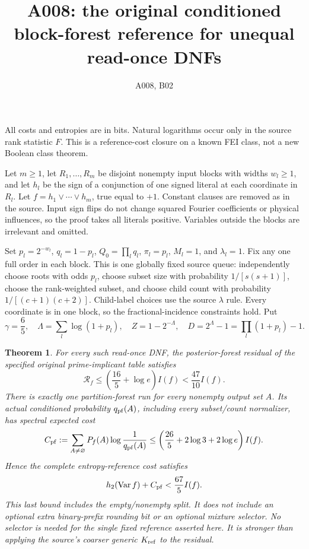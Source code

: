 \documentclass{article}
\newtheorem{theorem}{Theorem}
\begin{document}
\title{A008: the original conditioned block-forest reference for unequal read-once DNFs}
\author{A008, B02}\maketitle
All costs and entropies are in bits. Natural logarithms occur only in the source rank statistic $F$. This is a reference-cost closure on a known FEI class, not a new Boolean class theorem.

Let $m\ge1$, let $R_1,\ldots,R_m$ be disjoint nonempty input blocks with widths $w_l\ge1$, and let $h_l$ be the sign of a conjunction of one signed literal at each coordinate in $R_l$. Let $f=h_1\vee\cdots\vee h_m$, true equal to $+1$. Constant clauses are removed as in the source. Input sign flips do not change squared Fourier coefficients or physical influences, so the proof takes all literals positive. Variables outside the blocks are irrelevant and omitted.

Set $p_l=2^{-w_l}$, $q_l=1-p_l$, $Q_0=\prod_lq_l$, $\pi_l=p_l$, $M_l=1$, and $\lambda_l=1$. Fix any one full order in each block. This is one globally fixed source queue: independently choose roots with odds $p_l$, choose subset size with probability $1/[s(s+1)]$, choose the rank-weighted subset, and choose child count with probability $1/[(c+1)(c+2)]$. Child-label choices use the source $\lambda$ rule. Every coordinate is in one block, so the fractional-incidence constraints hold. Put
\[
 \gamma=\frac65,\quad \Lambda=\sum_l\log(1+p_l),\quad
 Z=1-2^{-\Lambda},\quad D=2^\Lambda-1=\prod_l(1+p_l)-1.
\]

\begin{theorem}
For every such read-once DNF, the posterior-forest residual of the specified original prime-implicant table satisfies
\[
 \mathcal R_f\le\left(\frac{16}{5}+\log e\right)I(f)
 <\frac{47}{10}I(f).
\]
There is exactly one partition-forest run for every nonempty output set $A$. Its actual conditioned probability $q_{\rm pf}(A)$, including every subset/count normalizer, has spectral expected cost
\[
 C_{\rm pf}:=\sum_{A\ne\varnothing}P_f(A)\log\frac1{q_{\rm pf}(A)}
 \le\left(\frac{26}{5}+2\log3+2\log e\right)I(f).
\]
Hence the complete entropy-reference cost satisfies
\[
 h_2(\operatorname{Var}f)+C_{\rm pf}<\frac{67}{5}I(f).
\]
This last bound includes the empty/nonempty split. It does not include an optional extra binary-prefix rounding bit or an optional mixture selector. No selector is needed for the single fixed reference asserted here. It is stronger than applying the source's coarser generic $K_{\rm ref}$ to the residual.
\end{theorem}
\end{document}
